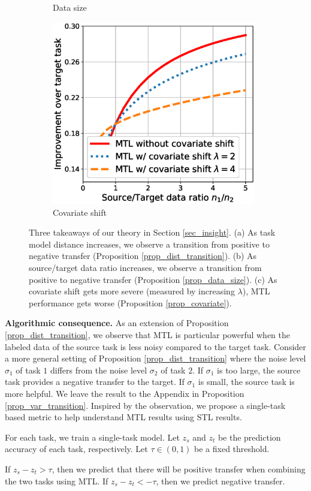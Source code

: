 \begin{figure}
\begin{subfigure}[b]{0.32\textwidth}
		\caption{Data size}
		\label{fig_size}
	\end{subfigure}\hfill
	\begin{subfigure}[b]{0.32\textwidth}
		\centering
		\includegraphics[width=0.98\textwidth]{figures/complementary.eps}
		\caption{Covariate shift}
		\label{fig_covariate}
	\end{subfigure}
	\caption{Three takeaways of our theory in Section \ref{sec_insight}.
	(a) As task model distance increases, we observe a transition from positive to negative transfer  (Proposition \ref{prop_dist_transition}).
	(b) As source/target data ratio increases, we observe a transition from positive to negative transfer (Proposition \ref{prop_data_size}).
	(c) As covariate shift gets more severe (measured by increasing $\lambda$), MTL performance gets worse (Proposition \ref{prop_covariate}).}
	\label{fig_model_shift_phasetrans}
\end{figure}

\textbf{Algorithmic consequence.}
As an extension of Proposition \ref{prop_dist_transition}, we observe that MTL is particular powerful when the labeled data of the source task is less noisy compared to the target task.
Consider a more general setting of Proposition \ref{prop_dist_transition} where the noise level $\sigma_1$ of task $1$ differs from the noise level $\sigma_2$ of task $2$.
If $\sigma_1$ is too large, the source task provides a negative transfer to the target.
If $\sigma_1$ is small, the source task is more helpful.
We leave the result to the Appendix in Proposition \ref{prop_var_transition}.
Inspired by the observation, we propose a single-task based metric to help understand MTL results using STL results.
\squishlist
	\item For each task, we train a single-task model.
	Let $z_s$ and $z_t$ be the prediction accuracy of each task, respectively.
	Let $\tau\in(0, 1)$ be a fixed threshold.
	\item If $z_s - z_t > \tau$, then we predict that there will be positive transfer when combining the two tasks using MTL.
	If $z_s - z_t < -\tau$, then we predict negative transfer.
\squishend


